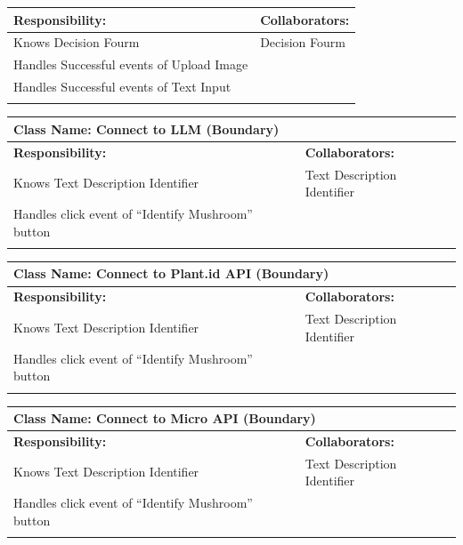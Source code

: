 \documentclass[]{article}
\begin{document}
\begin{itemize}
\begin{table}[ht]
\begin{tabular}{|p{6cm}|p{6cm}|}
		\hline
		\textbf{Responsibility:} & \textbf{Collaborators:} \\
		\hline
		Knows Decision Fourm & Decision Fourm \\
		Handles Successful events of Upload Image & \\
		Handles Successful events of Text Input & \\
		\vspace{1in} & \\
		\hline
		\end{tabular}
	\end{table}
	\begin{table}[ht]
		\centering
		\begin{tabular}{|p{6cm}|p{6cm}|}
		\hline 
		\multicolumn{2}{|l|}{\textbf{Class Name: Connect to LLM  (Boundary)}} \\
		\hline
		\textbf{Responsibility:} & \textbf{Collaborators:} \\
		\hline
		Knows Text Description Identifier & Text Description Identifier \\
		Handles click event of “Identify Mushroom” button & \\
		\vspace{1in} & \\
		\hline
		\end{tabular}
	\end{table}
	\begin{table}[ht]
		\centering
		\begin{tabular}{|p{6cm}|p{6cm}|}
		\hline 
		\multicolumn{2}{|l|}{\textbf{Class Name: Connect to Plant.id API (Boundary)}} \\
		\hline
		\textbf{Responsibility:} & \textbf{Collaborators:} \\
		\hline
		Knows Text Description Identifier & Text Description Identifier \\
		Handles click event of “Identify Mushroom” button & \\
		\vspace{1in} & \\
		\hline
		\end{tabular}
	\end{table}
	\begin{table}[ht]
		\centering
		\begin{tabular}{|p{6cm}|p{6cm}|}
		\hline 
		\multicolumn{2}{|l|}{\textbf{Class Name: Connect to  Micro API (Boundary)}} \\
		\hline
		\textbf{Responsibility:} & \textbf{Collaborators:} \\
		\hline
		Knows Text Description Identifier & Text Description Identifier \\
		Handles click event of “Identify Mushroom” button & \\
		\vspace{1in} & \\
		\hline
		\end{tabular}
	\end{table}
	
\end{itemize}
\end{document}
